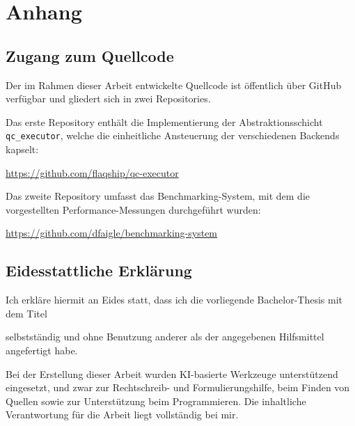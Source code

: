 
\chapter{Anhang}
\label{chap:anhang}


\section{Zugang zum Quellcode}
\label{sec:anhang_code}


Der im Rahmen dieser Arbeit entwickelte Quellcode ist öffentlich über GitHub
verfügbar und gliedert sich in zwei Repositories.


Das erste Repository enthält die Implementierung der Abstraktionsschicht
\texttt{qc\_executor}, welche die einheitliche Ansteuerung der verschiedenen
Backends kapselt:


\url{https://github.com/flaqship/qc-executor}


Das zweite Repository umfasst das Benchmarking-System, mit dem die vorgestellten Performance-Messungen
durchgeführt wurden:

\url{https://github.com/dfaigle/benchmarking-system}



\newpage
\section{Eidesstattliche Erklärung}
\thispagestyle{empty}

Ich erkläre hiermit an Eides statt, dass ich die vorliegende
Bachelor-Thesis mit dem Titel

\begin{center}
  \emph{\ThesisTitel}
\end{center}

selbstständig und ohne Benutzung anderer als der angegebenen Hilfsmittel
angefertigt habe.

Bei der Erstellung dieser Arbeit wurden KI-basierte Werkzeuge unterstützend
eingesetzt, und zwar zur Rechtschreib- und Formulierungshilfe, beim Finden
von Quellen sowie zur Unterstützung beim Programmieren. Die inhaltliche
Verantwortung für die Arbeit liegt vollständig bei mir.

